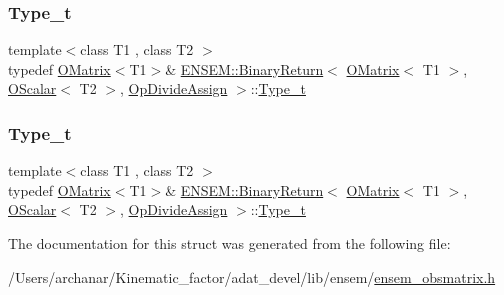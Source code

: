 \subsubsection{\texorpdfstring{Type\_t}{Type\_t}\hspace{0.1cm}{\footnotesize\ttfamily [1/2]}}
{\footnotesize\ttfamily template$<$class T1 , class T2 $>$ \\
typedef \mbox{\hyperlink{classENSEM_1_1OMatrix}{O\+Matrix}}$<$T1$>$\& \mbox{\hyperlink{structENSEM_1_1BinaryReturn}{E\+N\+S\+E\+M\+::\+Binary\+Return}}$<$ \mbox{\hyperlink{classENSEM_1_1OMatrix}{O\+Matrix}}$<$ T1 $>$, \mbox{\hyperlink{classENSEM_1_1OScalar}{O\+Scalar}}$<$ T2 $>$, \mbox{\hyperlink{structENSEM_1_1OpDivideAssign}{Op\+Divide\+Assign}} $>$\+::\mbox{\hyperlink{structENSEM_1_1BinaryReturn_3_01OMatrix_3_01T1_01_4_00_01OScalar_3_01T2_01_4_00_01OpDivideAssign_01_4_a102ea2da5914e62170be58225f52a842}{Type\+\_\+t}}}

\mbox{\label{structENSEM_1_1BinaryReturn_3_01OMatrix_3_01T1_01_4_00_01OScalar_3_01T2_01_4_00_01OpDivideAssign_01_4_a102ea2da5914e62170be58225f52a842}} 
\subsubsection{\texorpdfstring{Type\_t}{Type\_t}\hspace{0.1cm}{\footnotesize\ttfamily [2/2]}}
{\footnotesize\ttfamily template$<$class T1 , class T2 $>$ \\
typedef \mbox{\hyperlink{classENSEM_1_1OMatrix}{O\+Matrix}}$<$T1$>$\& \mbox{\hyperlink{structENSEM_1_1BinaryReturn}{E\+N\+S\+E\+M\+::\+Binary\+Return}}$<$ \mbox{\hyperlink{classENSEM_1_1OMatrix}{O\+Matrix}}$<$ T1 $>$, \mbox{\hyperlink{classENSEM_1_1OScalar}{O\+Scalar}}$<$ T2 $>$, \mbox{\hyperlink{structENSEM_1_1OpDivideAssign}{Op\+Divide\+Assign}} $>$\+::\mbox{\hyperlink{structENSEM_1_1BinaryReturn_3_01OMatrix_3_01T1_01_4_00_01OScalar_3_01T2_01_4_00_01OpDivideAssign_01_4_a102ea2da5914e62170be58225f52a842}{Type\+\_\+t}}}



The documentation for this struct was generated from the following file\+:\begin{DoxyCompactItemize}
\item 
/\+Users/archanar/\+Kinematic\+\_\+factor/adat\+\_\+devel/lib/ensem/\mbox{\hyperlink{lib_2ensem_2ensem__obsmatrix_8h}{ensem\+\_\+obsmatrix.\+h}}\end{DoxyCompactItemize}
